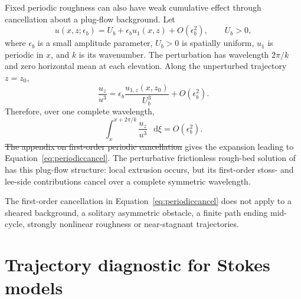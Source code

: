 \documentclass[review]{igs}
\providecommand{\DIFadd}[1]{{\protect\color{blue}\uwave{#1}}} %
\providecommand{\DIFdel}[1]{{\protect\color{red}\sout{#1}}}                      %
\providecommand{\DIFaddbegin}{} %
\providecommand{\DIFaddend}{} %
\providecommand{\DIFdelbegin}{} %
\providecommand{\DIFdelend}{} %
\newcommand{\DIFscaledelfig}{0.5}
\newlength{\DIFdelgraphicswidth} %
\newlength{\DIFdelgraphicsheight} %
\newcommand{\DIFaddincludegraphics}[2][]{{\color{blue}\fbox{\DIFOincludegraphics[#1]{#2}}}} %
\newcommand{\DIFdelincludegraphics}[2][]{%
\sbox{\DIFdelgraphicsbox}{\DIFOincludegraphics[#1]{#2}}%
\settoboxwidth{\DIFdelgraphicswidth}{\DIFdelgraphicsbox} %
\settoboxtotalheight{\DIFdelgraphicsheight}{\DIFdelgraphicsbox} %
\scalebox{\DIFscaledelfig}{%
\parbox[b]{\DIFdelgraphicswidth}{\usebox{\DIFdelgraphicsbox}\\[-\baselineskip] \rule{\DIFdelgraphicswidth}{0em}}\llap{\resizebox{\DIFdelgraphicswidth}{\DIFdelgraphicsheight}{%
\setlength{\unitlength}{\DIFdelgraphicswidth}%
\begin{picture}(1,1)%
\thicklines\linethickness{2pt} %
{\color[rgb]{1,0,0}\put(0,0){\framebox(1,1){}}}%
{\color[rgb]{1,0,0}\put(0,0){\line( 1,1){1}}}%
{\color[rgb]{1,0,0}\put(0,1){\line(1,-1){1}}}%
\end{picture}%
}\hspace*{3pt}}} %
} %
\DeclareRobustCommand{\DIFaddbegin}{\DIFOaddbegin \let\includegraphics\DIFaddincludegraphics} %
\DeclareRobustCommand{\DIFaddend}{\DIFOaddend \let\includegraphics\DIFOincludegraphics} %
\DeclareRobustCommand{\DIFdelbegin}{\DIFOdelbegin \let\includegraphics\DIFdelincludegraphics} %
\DeclareRobustCommand{\DIFdelend}{\DIFOaddend \let\includegraphics\DIFOincludegraphics} %
\begin{document}
Fixed periodic roughness can also have weak cumulative effect through cancellation about a plug-flow background. Let
\begin{equation}
 u(x,z;\epsilon_b)=U_b+\epsilon_b u_1(x,z)+O(\epsilon_b^2),
 \qquad U_b>0,
\label{eq:plugperturbation}
\end{equation}
where \(\epsilon_b\) is a small amplitude parameter, \(U_b>0\) is spatially uniform, \(u_1\) is periodic in \(x\), and \(k\) is its wavenumber. The perturbation has wavelength \(2\pi/k\) and zero horizontal mean at each elevation. Along the unperturbed trajectory \(z=z_0\),
\begin{equation}
\frac{u_z}{u^3}
=\epsilon_b\frac{u_{1,z}(x,z_0)}{U_b^3}+O(\epsilon_b^2).
\label{eq:periodicshear}
\end{equation}
Therefore, over one complete wavelength,
\begin{equation}
\int_{x}^{x+2\pi/k}\frac{u_z}{u^3}\,\mathop{}\!\mathrm{d}\xi=O(\epsilon_b^2).
\label{eq:periodiccancel}
\end{equation}
\DIFdelbegin \DIFdel{The appendix on first-order periodic cancellation }\DIFdelend \DIFaddbegin \DIFadd{Appendix~\ref{app:periodic} }\DIFaddend gives the expansion leading to Equation~\ref{eq:periodiccancel}. The perturbative frictionless rough-bed solution of \citet{Gudmundsson1997linear} has this plug-flow structure: local extrusion occurs, but its first-order stoss- and lee-side contributions cancel over a complete symmetric wavelength.

The first-order cancellation in Equation~\ref{eq:periodiccancel} does not apply to a sheared background, a solitary asymmetric obstacle, a finite path ending mid-cycle, strongly nonlinear roughness or near-stagnant trajectories.

\DIFdelbegin %
\DIFdelend \DIFaddbegin \section{Trajectory diagnostic for Stokes models}
\DIFaddend 
\end{document}
